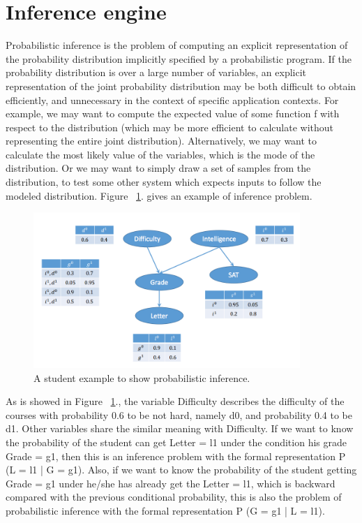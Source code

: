 \section{Inference engine}
\label{sec:infer}
Probabilistic inference is the problem of computing an explicit representation of the probability distribution implicitly specified by a probabilistic program. If the probability distribution is over a large number of variables, an explicit representation of the joint probability distribution may be both difficult to obtain efficiently, and unnecessary in the context of specific application contexts. For example, we may want to compute the expected value of some function f with respect to the distribution (which may be more efficient to calculate without representing the entire joint distribution). Alternatively, we may want to calculate the most likely value of the variables, which is the mode of the distribution. Or we may want to simply draw a set of samples from the distribution, to test some other system which expects inputs to follow the modeled distribution.
Figure ~\ref{fig:infer_eg}. gives an example of inference problem.

\begin{figure}
    \centering
    \includegraphics[width=0.9\textwidth]{figures/inference.png}
    \caption{A student example to show probabilistic inference.}
    \label{fig:infer_eg}
\end{figure}


As is showed in Figure ~\ref{fig:infer_eg}., the variable Difficulty describes the difficulty of the courses with probability 0.6 to be not hard, namely d0, and probability 0.4 to be d1. Other variables share the similar meaning with Difficulty. If we want to know the probability of the student can get Letter = l1 under the condition his grade Grade = g1, then this is an inference problem with the formal representation P (L = l1 | G = g1). Also, if we want to know the probability of the student getting Grade = g1 under he/she has already get the Letter = l1, which is backward compared with the previous conditional probability, this is also the problem of probabilistic inference with the formal representation P (G = g1 | L = l1).

